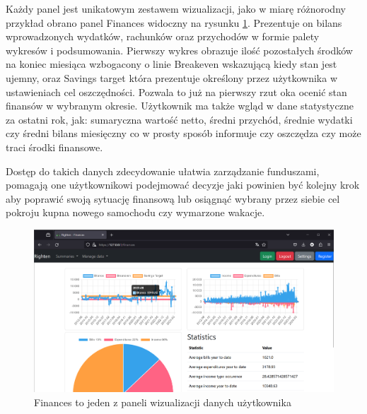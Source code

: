 \documentclass[a4paper, 10pt, twoside, openright]{report}
\begin{document}
\begin{large}
{Każdy panel jest unikatowym zestawem wizualizacji, jako w miarę różnorodny 
przykład obrano panel Finances widoczny na rysunku 
\ref{fig:usage_visualization_finances}. Prezentuje on bilans wprowadzonych 
wydatków, rachunków oraz przychodów w formie palety wykresów i podsumowania. 
Pierwszy wykres obrazuje ilość pozostałych środków na koniec miesiąca wzbogacony
 o linie Breakeven wskazującą kiedy stan jest ujemny, oraz Savings target która 
prezentuje określony przez użytkownika w ustawieniach cel oszczędności. Pozwala 
to już na pierwszy rzut oka ocenić stan finansów w wybranym okresie. Użytkownik 
ma także wgląd w dane statystyczne za ostatni rok, jak: sumaryczna wartość 
netto, średni przychód, średnie wydatki czy średni bilans miesięczny co w prosty
 sposób informuje czy oszczędza czy może traci środki finansowe.}

{Dostęp do takich danych zdecydowanie ułatwia zarządzanie funduszami, pomagają 
one użytkownikowi podejmować decyzje jaki powinien być kolejny krok aby poprawić
 swoją sytuację finansową lub osiągnąć wybrany przez siebie cel pokroju kupna 
nowego samochodu czy wymarzone wakacje.}

\begin{figure}[H]           %
    \centering
    \includegraphics[width=12cm]{figures/Righten_usage_example_visualization_finances.png}
    \caption{Finances to jeden z paneli wizualizacji danych użytkownika}
    \label{fig:usage_visualization_finances}
\end{figure}


\end{large}
\end{document}
